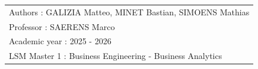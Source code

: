 \begin{titlepage}
\begin{tcolorbox}
        \begin{flushleft}
            {\selectfont \fontsize{12}{13}\selectfont \color{white} 
                \begin{tabular}{l}
                    Authors : GALIZIA Matteo, MINET Bastian, SIMOENS Mathias\\
                    Professor : SAERENS Marco \\
                    Academic year : 2025 - 2026 \\
                    LSM Master 1 : Business Engineering - Business Analytics
                \end{tabular}
            }
        \end{flushleft}
    \end{tcolorbox}
\end{titlepage}